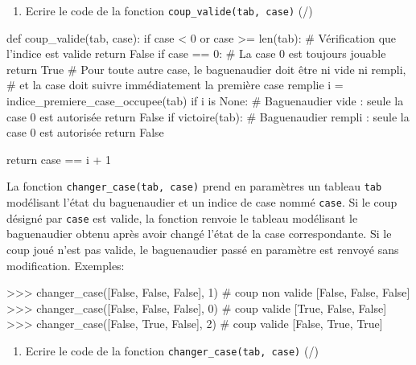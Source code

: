  \begin{enumerate}[resume=monDS]
\item Ecrire le code de la fonction \verb|coup_valide(tab, case)|  (/)
\end{enumerate}

\begin{blocvisible}[height=8]
    \begin{CodePythontexAlt}[TaillePolice=\large, Largeur=1\linewidth,Centre,Lignes=true,PremLigne=1]{}
    def coup_valide(tab, case):
    if case < 0 or case >= len(tab):     # Vérification que l'indice est valide
        return False
    if case == 0:                        # La case 0 est toujours jouable
        return True
    # Pour toute autre case, le baguenaudier doit être ni vide ni rempli,
    # et la case doit suivre immédiatement la première case remplie
    i = indice_premiere_case_occupee(tab)
    if i is None:        # Baguenaudier vide : seule la case 0 est autorisée
        return False
    if victoire(tab):    # Baguenaudier rempli : seule la case 0 est autorisée
        return False
    
    return case == i + 1
    \end{CodePythontexAlt}
\end{blocvisible}

\medskip

La fonction \verb|changer_case(tab, case)| prend en paramètres un tableau \texttt{tab} modélisant l'état du baguenaudier et un indice de case nommé \texttt{case}. Si le coup désigné par \texttt{case} est valide, la fonction renvoie le tableau modélisant le baguenaudier obtenu après avoir changé l'état de la case correspondante. Si le coup joué n'est pas valide, le baguenaudier passé en paramètre est renvoyé sans modification. 
Exemples:

\begin{CodePythontexAlt}[TaillePolice=\large, Largeur=1\linewidth,Centre,Lignes=true,PremLigne=1]{}
>>> changer_case([False, False, False], 1)  # coup non valide
[False, False, False]
>>> changer_case([False, False, False], 0)  # coup valide
[True, False, False]
>>> changer_case([False, True, False], 2)   # coup valide
[False, True, True]
    
\end{CodePythontexAlt}
\begin{enumerate}[resume=monDS]
\item Ecrire le code de la fonction \verb|changer_case(tab, case)|  (/)
\end{enumerate}


